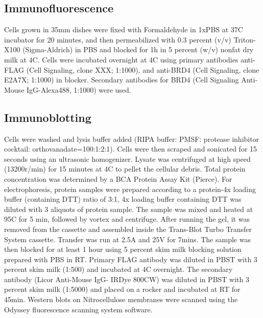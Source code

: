 \subsection{Immunofluorescence}
Cells grown in 35mm dishes were fixed with Formaldehyde in 1xPBS at 37C incubator for 20 minutes, and then permeabilized with 0.3 percent (v/v) Triton-X100 (Sigma-Aldrich) in PBS and blocked for 1h in 5 percent (w/v) nonfat dry milk at 4C. Cells were incubated overnight at 4C using primary antibodies anti-FLAG (Cell Signaling, clone XXX; 1:1000), and anti-BRD4 (Cell Signaling, clone E2A7X; 1:1000)  in blocker. Secondary antibodies for BRD4 (Cell Signaling Anti-Mouse IgG-Alexa488, 1:1000) were used. 

\subsection{Immunoblotting}
Cells were washed and lysis buffer added (RIPA buffer: PMSF: protease inhibitor cocktail: orthovanadate=100:1:2:1). Cells were then scraped and sonicated for 15 seconds using an ultrasonic homogenizer. Lysate was centrifuged at high speed (13200r/min) for 15 minutes at 4C to pellet the cellular debris. Total protein concentration was determined by a BCA Protein Assay Kit (Pierce). For electrophoresis, protein samples were prepared according to a protein-4x loading buffer (containing DTT) ratio of 3:1, 4x loading buffer containing DTT was diluted with 3 aliquots of protein sample. The sample was mixed and heated at 95C for 5 min, followed by vortex and centrifuge. After running the gel, it was removed from the cassette and assembled inside the Trans-Blot Turbo Transfer System cassette. Transfer was run at 2.5A and 25V for 7mins. The sample was then blocked for at least 1 hour using 5 percent skim milk blocking solution prepared with PBS in RT. Primary FLAG antibody was diluted in PBST with 3 percent skim milk (1:500) and incubated at 4C overnight. The secondary antibody (Licor Anti-Mouse IgG- IRDye 800CW) was diluted in PBST with 3 percent skim milk (1:5000) and placed on a rocker and incubated at RT for 45min. Western blots on Nitrocellulose membranes were scanned using the Odyssey fluorescence scanning system software.

